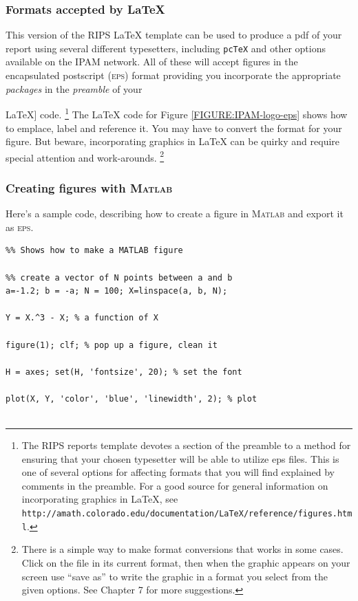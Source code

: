 \subsubsection{Formats accepted by {\LaTeX}}
This version of the  RIPS {\LaTeX } template can be used to produce a pdf of your report using several different typesetters, including \texttt{pcTeX} and other options available on the IPAM network.
All of these will accept figures in the encapsulated postscript (\textsc{eps}) format providing you incorporate the appropriate \emph{packages} in the \emph{preamble} of your {\LaTeX] code.%
\footnote{
The RIPS reports template devotes a section of the preamble to a method for ensuring that your chosen typesetter will be able to utilize eps files. 
This is one of several options for affecting formats that you will find explained by comments in the preamble.
For a good source for general information on incorporating graphics in {\LaTeX}, see
\texttt{http://amath.colorado.edu/documentation/LaTeX/reference/figures.html}.
}%
The LaTeX code for Figure \ref{FIGURE:IPAM-logo-eps} shows how to emplace, label and reference it.
You may have to convert the format for your figure.
But beware, incorporating graphics in {\LaTeX} can be quirky and require special attention and work-arounds.%
\footnote{There is a simple way to make format conversions that works in some cases.
Click on the file in its current format, then when the graphic appears on your screen use ``save as'' to write the graphic in a format you select from the given options.
See Chapter 7 for more suggestions.}

\subsubsection{Creating figures with {\textsc{Matlab}}}
Here's a sample code, describing how to create a figure in \textsc{Matlab} and export it as \textsc{eps}.

\begin{verbatim}
%% Shows how to make a MATLAB figure

%% create a vector of N points between a and b
a=-1.2; b = -a; N = 100; X=linspace(a, b, N);

Y = X.^3 - X; % a function of X

figure(1); clf; % pop up a figure, clean it

H = axes; set(H, 'fontsize', 20); % set the font

plot(X, Y, 'color', 'blue', 'linewidth', 2); % plot


\end{verbatim}}
